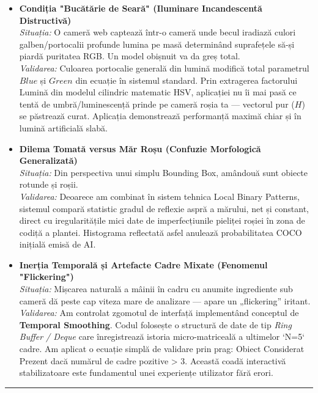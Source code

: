 \documentclass[12pt,a4paper]{article}
\begin{document}
\begin{itemize}
    \item \textbf{Condiția "Bucătărie de Seară" (Iluminare Incandescentă Distructivă)} \\
    \textit{Situația:} O cameră web captează într-o cameră unde becul iradiază culori galben/portocalii profunde lumina pe masă determinând suprafețele să-și piardă puritatea RGB. Un model obișnuit va da greș total.\\
    \textit{Validarea:} Culoarea portocalie generală din lumină modifică total parametrul $Blue$ și $Green$ din ecuație în sistemul standard. Prin extragerea factorului Lumină din modelul cilindric matematic HSV, aplicației nu îi mai pasă ce tentă de umbră/luminescență prinde pe cameră roșia ta — vectorul pur ($H$) se păstrează curat. Aplicația demonstrează performanță maximă chiar și în lumină artificială slabă.

    \item \textbf{Dilema Tomată versus Măr Roșu (Confuzie Morfologică Generalizată)} \\
    \textit{Situația:} Din perspectiva unui simplu Bounding Box, amândouă sunt obiecte rotunde și roșii.\\
    \textit{Validarea:} Deoarece am combinat în sistem tehnica Local Binary Patterns, sistemul compară statistic gradul de reflexie aspră a mărului, net și constant, direct cu iregularitățile mici date de imperfecțiunile pieliței roșiei în zona de codiță a plantei. Histograma reflectată asfel anulează probabilitatea COCO inițială emisă de AI.

    \item \textbf{Inerția Temporală și Artefacte Cadre Mixate (Fenomenul "Flickering")} \\
    \textit{Situația:} Mișcarea naturală a mâinii în cadru cu anumite ingrediente sub cameră dă peste cap viteza mare de analizare — apare un „flickering” iritant.\\
    \textit{Validarea:} Am controlat zgomotul de interfață implementând conceptul de \textbf{Temporal Smoothing}. Codul folosește o structură de date de tip \textit{Ring Buffer / Deque} care înregistrează istoria micro-matriceală a ultimelor `N=5` cadre. Am aplicat o ecuație simplă de validare prin prag: Obiect Considerat Prezent dacă numărul de cadre pozitive > 3. Această coadă interactivă stabilizatoare este fundamentul unei experiențe utilizator fără erori.
\end{itemize}

\vspace{0.5cm}
\hrule
\vspace{0.5cm}
\end{document}
